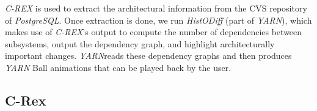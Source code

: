 \documentclass[times, 10pt,twocolumn]{article}
\newcommand{\yarn}{\emph{YARN\xspace}}
\newcommand{\YARN}{\yarn}
\newcommand{\postgresql}{\emph{PostgreSQL}\xspace}
\newcommand{\Subsection}[1]{\subsection{#1}}
\newcommand{\shtn}{\vspace*{-.5em}}
\begin{document}

\shtn
{}
\shtn


\emph{C-REX} is used to extract the architectural information from the
CVS repository of \postgresql.  Once extraction is done, we run
\emph{HistODiff} (part of \YARN), which makes use of \emph{C-REX}'s
output to compute the number of dependencies between subsystems,
output the dependency graph, and highlight architecturally important
changes.  \YARN reads these dependency graphs and then produces \YARN
Ball animations that can be played back by the user.

\shtn
\Subsection{C-Rex}
\shtn

\end{document}
